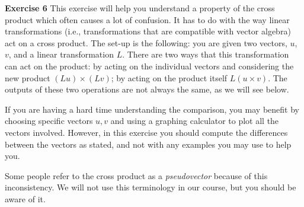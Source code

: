\documentclass[12pt,oneside]{exam}
\newenvironment{exercise}[1]{\vspace{.1in}\noindent\textbf{Exercise #1 \hspace{.05em}}}{}
\begin{document}
\begin{exercise}{6}
This exercise will help you understand a property of the cross product which often causes a lot of confusion. It has to do with the way linear transformations (i.e., transformations that are compatible with vector algebra) act on a cross product. The set-up is the following: you are given two vectors, $u$, $v$, and a linear transformation $L$. There are two ways that this transformation can act on the product: by acting on the individual vectors and considering the new product $(Lu)\times (Lv)$; by acting on the product itself $L(u\times v)$. The outputs of these two operations are not always the same, as we will see below. 


If you are having a hard time understanding the comparison, you may benefit by choosing specific vectors $u,v$ and using a graphing calculator to plot all the vectors involved. However, in this exercise you should compute the differences between the vectors as stated, and not with any examples you may use to help you. 
 
Some people refer to the cross product as a \textit{pseudovector} because of this inconsistency. We will not use this terminology in our course, but you should be aware of it. 
\end{exercise}
\end{document}
